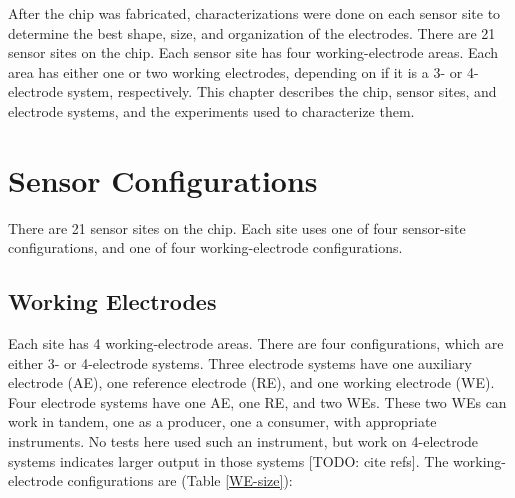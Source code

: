 After the chip was fabricated, characterizations were done on each sensor site to determine the best shape, size, and organization of the electrodes. There are 21 sensor sites on the chip. Each sensor site has four working-electrode areas. Each area has either one or two working electrodes, depending on if it is a 3- or 4-electrode system, respectively. This chapter describes the chip, sensor sites, and electrode systems, and the experiments used to characterize them.

\section{Sensor Configurations}

There are 21 sensor sites on the chip. Each site uses one of four sensor-site configurations, and one of four working-electrode configurations.

\subsection{Working Electrodes}

Each site has 4 working-electrode areas. There are four configurations, which are either 3- or 4-electrode systems. Three electrode systems have one auxiliary electrode (AE), one reference electrode (RE), and one working electrode (WE). Four electrode systems have one AE, one RE, and two WEs. These two WEs can work in tandem, one as a producer, one a consumer, with appropriate instruments. No tests here used such an instrument, but work on 4-electrode systems indicates larger output in those systems [TODO: cite refs]. The working-electrode configurations are (Table \ref{WE-size}):

